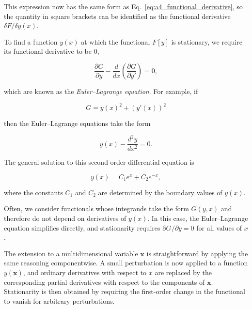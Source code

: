 \documentclass[10pt,twocolumn]{memoir}
\begin{document}
This expression now has the same form as Eq.~\ref{eq:a4_functional_derivative}, so the quantity in square brackets can be identified as the functional derivative $\delta F/\delta y(x)$.

To find a function $y(x)$ at which the functional $F[y]$ is stationary, we require its functional derivative to be 0,

\begin{equation}
    \frac{\partial G}{\partial y} - \frac{d}{dx}\left(\frac{\partial G}{\partial y'}\right) = 0,
\label{eq:a4_euler_lagrange_equation}
\end{equation}

which are known as the \textit{Euler--Lagrange equation}. For example, if

\begin{equation}
    G = y(x)^2 + \left(y'(x)\right)^2
\end{equation}

then the Euler--Lagrange equations take the form

\begin{equation}
    y(x) - \frac{d^2y}{dx^2} = 0.
\end{equation}

The general solution to this second-order differential equation is

\begin{equation}
    y(x) = C_1 e^x + C_2 e^{-x},
\end{equation}

where the constants $C_1$ and $C_2$ are determined by the boundary values of $y(x)$.

Often, we consider functionals whose integrands take the form $G(y,x)$ and therefore do not depend on derivatives of $y(x)$. In this case, the Euler--Lagrange equation simplifies directly, and stationarity requires $\partial G / \partial y = 0$ for all values of $x$.

The extension to a multidimensional variable $\mathbf{x}$ is straightforward by applying the same reasoning componentwise. A small perturbation is now applied to a function $y(\mathbf{x})$, and ordinary derivatives with respect to $x$ are replaced by the corresponding partial derivatives with respect to the components of $\mathbf{x}$. Stationarity is then obtained by requiring the first-order change in the functional to vanish for arbitrary perturbations.
\end{document}
